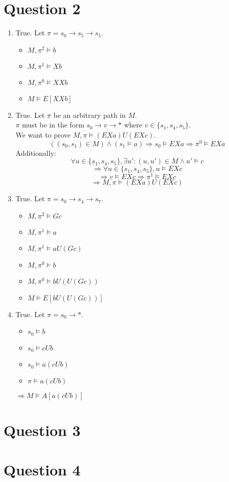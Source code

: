 \documentclass{article}
\begin{document}
\section*{Question 2}
\begin{enumerate}
    \item True. Let $\pi=s_0\rightarrow s_5\rightarrow s_5$.
        \begin{itemize}
            \item $M,\pi^2\models b$
            \item $M,\pi^1\models Xb$
            \item $M,\pi^0\models XXb$
            \item $M\models E[XXb]$
        \end{itemize}
    \item True. Let $\pi$ be an arbitrary path in $M$.\\
        $\pi$ must be in the form $s_0\rightarrow v\rightarrow *$
        where $v\in\{s_1,s_4,s_5\}$.\\
        We want to prove $M,\pi\models (EXa)U(EXc)$.\\
        \[\left((s_0,s_1)\in M\right)\wedge\left(s_1\models a\right)\Rightarrow s_0\models EXa\Rightarrow \pi^0\models EXa\]
        Additionally:
        \[\forall u\in\{s_1,s_4,s_5\}, \exists u':(u,u')\in M\wedge u'\models c\]
        \[\Rightarrow \forall u\in\{s_1,s_4,s_5\}, u\models EXc\]
        \[\Rightarrow v\models EXc\Rightarrow \pi^1\models EXc\]
        \[\Rightarrow M,\pi\models (EXa)U(EXc)\]
    \item True. Let $\pi=s_0\rightarrow s_4\rightarrow s_7$.
        \begin{itemize}
            \item $M,\pi^2\models Gc$
            \item $M,\pi^1\models a$
            \item $M,\pi^1\models aU(Gc)$
            \item $M,\pi^0\models b$
            \item $M,\pi^0\models bU(U(Gc))$
            \item $M\models E[bU(U(Gc))]$
        \end{itemize}
    \item True. Let $\pi=s_0\rightarrow *$.\\
        \begin{itemize}
            \item $s_0\models b$
            \item $s_0\models cUb$
            \item $s_0\models a(cUb)$
            \item $\pi\models a(cUb)$
        \end{itemize}
        $\Rightarrow M\models A[a(cUb)]$
\end{enumerate}
\section*{Question 3}
\section*{Question 4}
\end{document}
